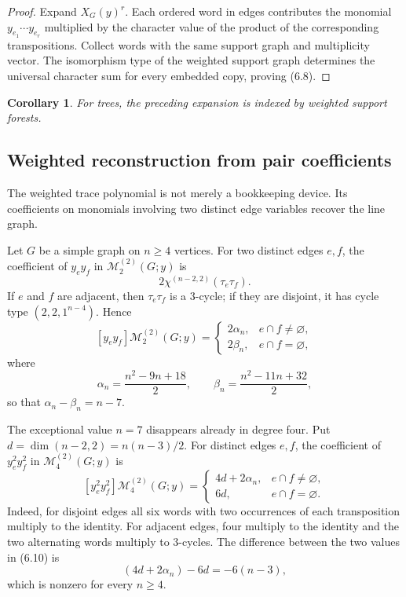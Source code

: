 \documentclass{amsart}
\newtheorem{corollary}{Corollary}
\theoremstyle{definition}
\begin{document}
\begin{proof}
Expand $X_G(y)^r$.  Each ordered word in edges contributes the monomial
$y_{e_1}\cdots y_{e_r}$ multiplied by the character value of the product of
the corresponding transpositions.  Collect words with the same support
graph and multiplicity vector.  The isomorphism type of the weighted
support graph determines the universal character sum for every embedded
copy, proving (6.8).
\end{proof}

\begin{corollary}
For trees, the preceding expansion is indexed by weighted support forests.
\end{corollary}

\subsection{Weighted reconstruction from pair coefficients}

The weighted trace polynomial is not merely a bookkeeping device.  Its
coefficients on monomials involving two distinct edge variables recover the
line graph.

Let $G$ be a simple graph on $n\geq4$ vertices.  For two distinct edges
$e,f$, the coefficient of $y_ey_f$ in $\mathcal M_2^{(2)}(G;y)$ is
\[
2\chi^{(n-2,2)}(\tau_e\tau_f).
\]
If $e$ and $f$ are adjacent, then $\tau_e\tau_f$ is a $3$-cycle; if they are
disjoint, it has cycle type $(2,2,1^{n-4})$.  Hence
\[
[y_ey_f]\mathcal M_2^{(2)}(G;y)=
\begin{cases}
2\alpha_n,&e\cap f\neq\varnothing,\\
2\beta_n,&e\cap f=\varnothing,
\end{cases}
\tag{6.9}
\]
where
\[
\alpha_n=\frac{n^2-9n+18}{2},\qquad
\beta_n=\frac{n^2-11n+32}{2},
\]
so that $\alpha_n-\beta_n=n-7$.

The exceptional value $n=7$ disappears already in degree four.  Put
$d=\dim(n-2,2)=n(n-3)/2$.  For distinct edges $e,f$, the coefficient of
$y_e^2y_f^2$ in $\mathcal M_4^{(2)}(G;y)$ is
\[
[y_e^2y_f^2]\mathcal M_4^{(2)}(G;y)=
\begin{cases}
4d+2\alpha_n,&e\cap f\neq\varnothing,\\
6d,&e\cap f=\varnothing.
\end{cases}
\tag{6.10}
\]
Indeed, for disjoint edges all six words with two occurrences of each
transposition multiply to the identity.  For adjacent edges, four multiply
to the identity and the two alternating words multiply to $3$-cycles.  The
difference between the two values in (6.10) is
\[
(4d+2\alpha_n)-6d=-6(n-3),
\tag{6.11}
\]
which is nonzero for every $n\geq4$.
\end{document}
